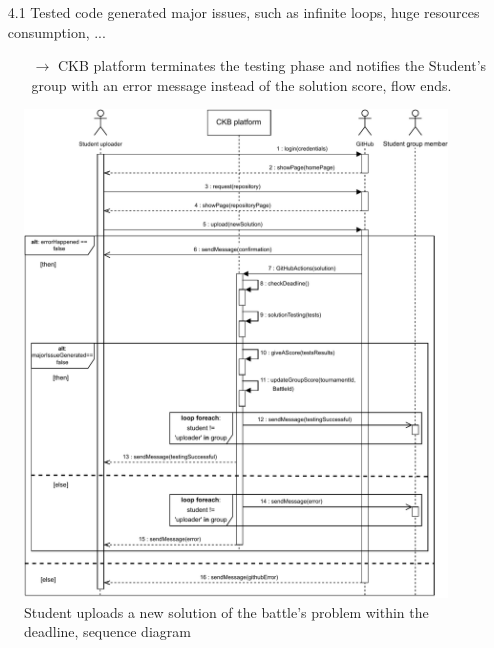 \documentclass{article}
\begin{document}
{\begin{enumerate}
\begin{xltabular}{\textwidth}
\begin{itemize}
                  \item[4.1] Tested code generated major issues, such as infinite loops,
                        huge resources consumption, ...
                        \begin{itemize}
                            \item[$\rightarrow$] CKB platform terminates the testing phase and
                                  notifies the Student's group with an error message instead of the
                                  solution score, flow ends.
                        \end{itemize}
              \end{itemize}
          \end{xltabular}

          \begin{figure}[H]
              \centering
              \includegraphics[scale=0.95]{images/SequenceDiagrams/Sequence11.pdf}
              \caption{Student uploads a new solution of the battle's problem within the deadline, sequence diagram}
              \label{fig:CorrectSolutionUploadSeqDiagram}
          \end{figure}


\end{enumerate}}
\end{document}
